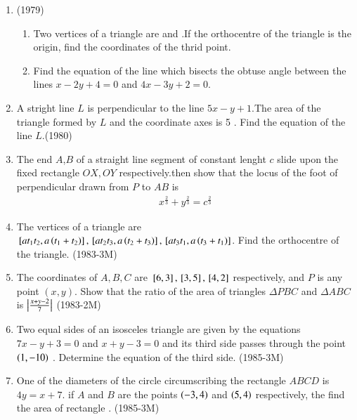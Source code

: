 \documentclass[journal,12pt,twocolumn]{IEEEtran}
\theoremstyle{remark}
\begin{document}
 \begin{enumerate}[start=4]


\item                    	\hfill{(1979)}
	\begin{enumerate}
             \item  Two vertices of a triangle are  and .If the orthocentre of the triangle is the origin, find the coordinates of the thrid point.
	     \item  Find the equation of the line which bisects the obtuse angle between  the lines $x-2y+4=0$ and $4x-3y+2=0$.
         \end{enumerate}

\item A stright line $L$ is perpendicular to the line $5x-y+1$.The area of the triangle formed by $L$ and the coordinate axes is 5 . Find the equation of the line $L$.\hfill{(1980)}

\item The end $A$,$B$ of a straight line segment of constant lenght $c$ slide upon the fixed rectangle $ OX,OY$ respectively.then show that the locus of the foot of perpendicular drawn from $P$ to $AB$ is 
 \begin{align*}  x^\frac{2}{3} + y^\frac{2}{3} = c^\frac{2}{3} \end{align*}

  \item The vertices of a triangle are ${}\left[ at_1t_2,a\left(t_1+t_2\right)\right], {}\left[ at_2t_3,a\left(t_2+t_3\right)\right],{}\left[at_3t_1,a\left(t_3+t_1\right)\right]$. Find the orthocentre of the triangle. \hfill{(1983-3M)}
	  
\item The coordinates of $A,B,C$ are $ {}\left[6,3\right] ,{}\left[3,5\right] , {}\left[4,2\right] $ respectively, and $P$ is any point $(x,y)$.
Show that the ratio of the area of triangles $\Delta PBC$  and $\Delta ABC$ is $\left\vert\frac{x+y-2}{7}\right\vert$ \hfill{(1983-2M)} 

\item Two equal sides of an isosceles triangle are given by the equations $7x-y+3=0$ and $x+y-3=0$ and its third side passes through the point $\left(1,-10\right)$ . Determine the equation of the third side.  \hfill{(1985-3M)}

\item One of the diameters of the circle circumscribing the rectangle $ABCD$ is $4y=x+ 7$. if $A$ and $B$ are the points $\left(-3,4\right)$ and $\left(5,4\right)$ respectively, the find the area of rectangle .  \hfill{(1985-3M)}



\end{enumerate}
\end{document}
